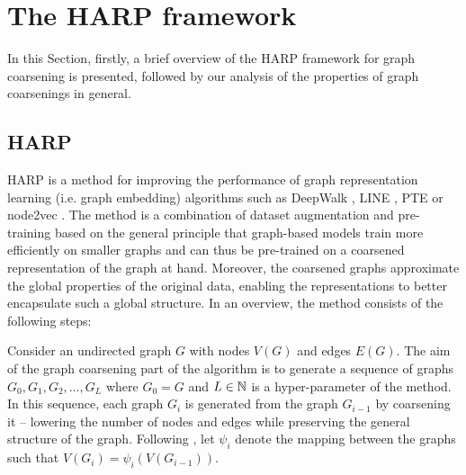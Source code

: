 \section{The HARP framework}

In this Section, firstly, a brief overview of the HARP framework for graph coarsening \cite{chen_harp_2018} is presented, followed by our analysis of the properties of graph coarsenings in general.

\subsection{HARP}
HARP is a method for improving the performance of graph representation learning (i.e. graph embedding) algorithms such as DeepWalk \cite{perozzi_deepwalk_2014}, LINE \cite{tang_line_2015}, PTE \cite{tang_pte_2015} or node2vec \cite{grover_node2vec_2016}. The method is a combination of dataset augmentation and pre-training based on the general principle that graph-based models train more efficiently on smaller graphs and can thus be pre-trained on a coarsened representation of the graph at hand. Moreover, the coarsened graphs approximate the global properties of the original data, enabling the representations to better encapsulate such a global structure. In an overview, the method consists of the following steps:

Consider an undirected graph \( G \) with nodes \( V \left( G \right) \) and edges \( E \left( G \right) \). The aim of the graph coarsening part of the algorithm is to generate a sequence of graphs \( G_0, G_1, G_2, \dots, G_L \) where \( G_0 = G \) and \( L \in \mathbb{N} \) is a hyper-parameter of the method. In this sequence, each graph \( G_i \) is generated from the graph \( G_{i - 1} \) by coarsening it -- lowering the number of nodes and edges while preserving the general structure of the graph. Following \cite{chen_harp_2018}, let \( \psi_i \) denote the mapping between the graphs such that \( V \left( G_i \right) = \psi_i \left( V \left( G_{i - 1} \right) \right) \).

